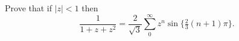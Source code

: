 Prove that if $|z| < 1$ then
\[
\frac{1}{1 + z + z^{2}}
  = \frac{2}{\sqrt{3}} \sum_{0}^{\infty} z^{n} \sin\{\tfrac{2}{3}(n + 1)\pi\}.
\]

